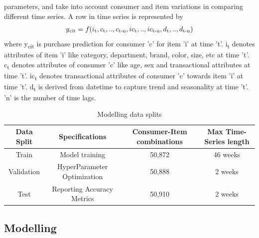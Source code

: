 parameters, and take into account consumer and item variations in comparing different time series. A row 
in time series is represented by
  \begin{equation}
    \begin{array}{l}
      y\textsubscript{cit}  = f(i\textsubscript{t}, c\textsubscript{t},..,c\textsubscript{t-n}, ic\textsubscript{t}
      ,..,ic\textsubscript{t-n}, d\textsubscript{t},..,d\textsubscript{t-n})
    \end{array}
    \label{eqn:fx}
  \end{equation}
where y\textsubscript{cit} is purchase prediction for consumer 'c' for item ’i’ at time ’t’. 
i\textsubscript{t} denotes attributes of item ’i’ like category, department, brand, color, size, etc at time 't'. 
c\textsubscript{t} denotes attributes of consumer 'c' like age, sex and transactional attributes at time 't'. 
ic\textsubscript{t} denotes transactional attributes of consumer 'c'  towards item 'i' at time 't'. 
d\textsubscript{t} is derived from datetime to capture trend and seasonality at time 't'. 
'n' is the number of time lags.

\begin{table}[t]
\caption{Modelling data splits}
\vspace{0.5 in}
\centering
\resizebox{4.4in}{!}
{%
\begin{tabular}{|c|c|c|c|}
\hline
{\bf Data Split} & {\bf Specifications} & {\bf Consumer-Item combinations} & {\bf Max Time-Series length} \\  
\hline\hline
Train  		&  Model training &  50,872 &  46 weeks \\ \hline
Validation	  		&  HyperParameter Optimization &  50,888 &  2 weeks \\ \hline
Test	  		&  Reporting Accuracy Metrics & 50,910 &  2 weeks\\
\hline
\end{tabular}
}
\label{tab:datasplit}
\end{table}

\subsection{Modelling}
